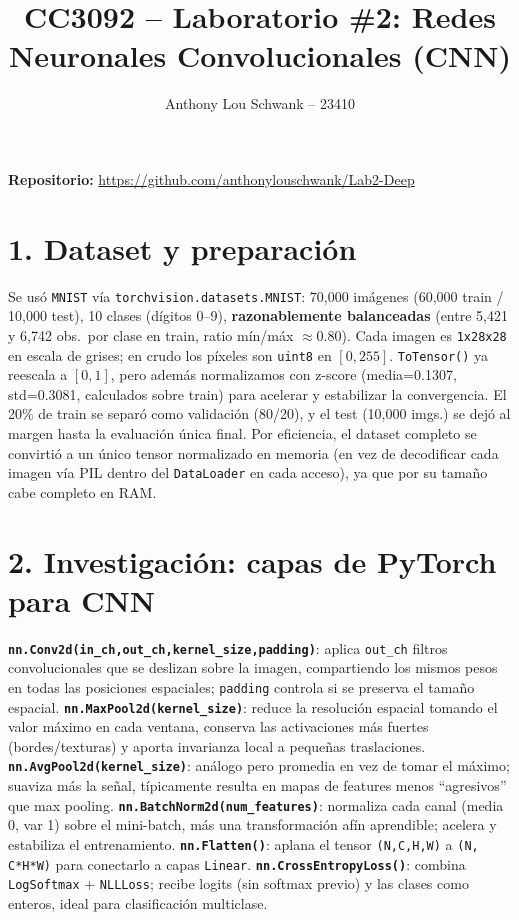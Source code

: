 \documentclass[9pt]{extarticle}
\title{\vspace{-1.5cm}\large CC3092 -- Laboratorio \#2: Redes Neuronales Convolucionales (CNN)}
\author{Anthony Lou Schwank -- 23410}
\date{}
\begin{document}
\maketitle
\vspace{-0.9cm}

\textbf{Repositorio:} \url{https://github.com/anthonylouschwank/Lab2-Deep}

\section*{1. Dataset y preparación}
Se usó \texttt{MNIST} vía \texttt{torchvision.datasets.MNIST}: 70{,}000 imágenes (60{,}000 train / 10{,}000 test), 10 clases (dígitos 0--9), \textbf{razonablemente balanceadas} (entre 5{,}421 y 6{,}742 obs.\ por clase en train, ratio mín/máx $\approx$0.80). Cada imagen es \texttt{1x28x28} en escala de grises; en crudo los píxeles son \texttt{uint8} en $[0,255]$. \texttt{ToTensor()} ya reescala a $[0,1]$, pero además normalizamos con z-score (media=0.1307, std=0.3081, calculados sobre train) para acelerar y estabilizar la convergencia. El 20\% de train se separó como validación (80/20), y el test (10{,}000 imgs.) se dejó al margen hasta la evaluación única final. Por eficiencia, el dataset completo se convirtió a un único tensor normalizado en memoria (en vez de decodificar cada imagen vía PIL dentro del \texttt{DataLoader} en cada acceso), ya que por su tamaño cabe completo en RAM.

\section*{2. Investigación: capas de PyTorch para CNN}
\textbf{\texttt{nn.Conv2d(in\_ch,out\_ch,kernel\_size,padding)}}: aplica \texttt{out\_ch} filtros convolucionales que se deslizan sobre la imagen, compartiendo los mismos pesos en todas las posiciones espaciales; \texttt{padding} controla si se preserva el tamaño espacial. \textbf{\texttt{nn.MaxPool2d(kernel\_size)}}: reduce la resolución espacial tomando el valor máximo en cada ventana, conserva las activaciones más fuertes (bordes/texturas) y aporta invarianza local a pequeñas traslaciones. \textbf{\texttt{nn.AvgPool2d(kernel\_size)}}: análogo pero promedia en vez de tomar el máximo; suaviza más la señal, típicamente resulta en mapas de features menos ``agresivos'' que max pooling. \textbf{\texttt{nn.BatchNorm2d(num\_features)}}: normaliza cada canal (media 0, var 1) sobre el mini-batch, más una transformación afín aprendible; acelera y estabiliza el entrenamiento. \textbf{\texttt{nn.Flatten()}}: aplana el tensor \texttt{(N,C,H,W)} a \texttt{(N, C*H*W)} para conectarlo a capas \texttt{Linear}. \textbf{\texttt{nn.CrossEntropyLoss()}}: combina \texttt{LogSoftmax} + \texttt{NLLLoss}; recibe logits (sin softmax previo) y las clases como enteros, ideal para clasificación multiclase.
\end{document}

